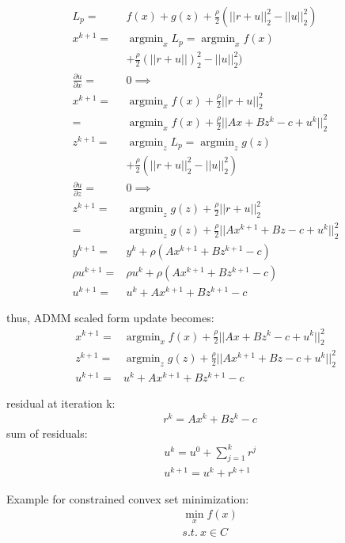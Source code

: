 \documentclass[8pt]{report}
\DeclareMathOperator*{\argmin}{argmin}
\begin{document}
\begin{multicols*}{2}
  \vfill\null
  \columnbreak
  
  \begin{align*}
    L_p = & f(x) + g(z) + \frac{\rho}{2} (||r+u||_2^2 - ||u||_2^2)\\
    x^{k+1} = & \argmin_{x} L_p = \argmin_{x} f(x)\\
          & + \frac{\rho}{2}(||r+u||)_2^2-||u||_2^2)\\
    \frac{\partial u}{\partial x} = & 0 \implies\\
    x^{k+1} = & \argmin_{x} f(x) + \frac{\rho}{2}||r+u||_2^2\\
    = & \argmin_{x} f(x) + \frac{\rho}{2}||Ax + Bz^k - c + u^k||_2^2\\
    z^{k+1} = & \argmin_{z} L_p = \argmin_{z} g(z)\\
          & + \frac{\rho}{2}(||r+u||_2^2-||u||_2^2)\\
    \frac{\partial u}{\partial z} = & 0 \implies\\
    z^{k+1} = & \argmin_{z} g(z) + \frac{\rho}{2}||r+u||_2^2\\
          = & \argmin_{z} g(z) + \frac{\rho}{2}||Ax^{k+1} + Bz - c + u^k||_2^2\\
    y^{k+1} = & y^k + \rho (Ax^{k+1} +Bz^{k+1} - c)\\
    \rho u^{k+1} = & \rho u^k + \rho (Ax^{k+1} +Bz^{k+1} - c)\\
    u^{k+1} = & u^k + Ax^{k+1} +Bz^{k+1} - c
  \end{align*}

  thus, ADMM scaled form update becomes:
  \begin{align*}
    x^{k+1} = & \argmin_{x} f(x) + \frac{\rho}{2}||Ax + Bz^k - c + u^k||_2^2\\
    z^{k+1} = & \argmin_{z} g(z) + \frac{\rho}{2}||Ax^{k+1} + Bz - c + u^k||_2^2\\
    u^{k+1} = & u^k + Ax^{k+1} +Bz^{k+1} - c
  \end{align*}

  residual at iteration k:
  \begin{align*}
    &r^k = Ax^k + Bz^k - c
  \end{align*}
  sum of residuals:
  \begin{align*}
    &u^k = u^0 + \sum_{j=1}^{k} r^j\\
    &u^{k+1} = u^k + r^{k+1}
  \end{align*}


  \vfill\null
  \columnbreak
  
  Example for constrained convex set minimization:
  \begin{align*}
    &\min_x f(x)\\
    &s.t.\ x \in C
  \end{align*}


\end{multicols*}
\end{document}
